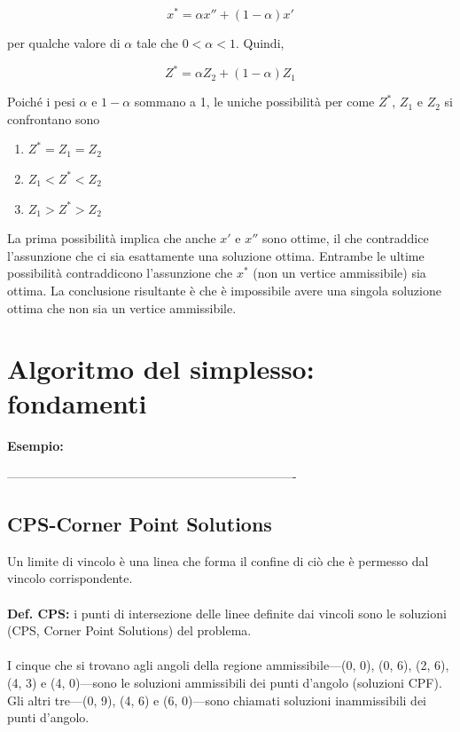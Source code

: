 \documentclass[a4paper, 11pt]{article}
\begin{document}
        $$
            x^* = \alpha x'' + (1 - \alpha) x'
        $$

        per qualche valore di $\alpha$ tale che $0 < \alpha < 1$. Quindi,

        $$
            Z^* = \alpha Z_2 + (1 - \alpha) Z_1
        $$

        Poiché i pesi $\alpha$ e $1 - \alpha$ sommano a 1, le uniche possibilità per come $Z^*$, $Z_1$ e $Z_2$ si confrontano sono

        \begin{enumerate}
            \item $Z^* = Z_1 = Z_2$
            \item $Z_1 < Z^* < Z_2$
            \item $Z_1 > Z^* > Z_2$
        \end{enumerate}

        La prima possibilità implica che anche $x'$ e $x''$ sono ottime, il che contraddice l'assunzione che ci sia esattamente una soluzione ottima. Entrambe le ultime possibilità contraddicono l'assunzione che $x^*$ (non un vertice ammissibile) sia ottima. La conclusione risultante è che è impossibile avere una singola soluzione ottima che non sia un vertice ammissibile.

       

    \section{Algoritmo del simplesso: fondamenti}
    \textbf{Esempio: }

    ----------------------------------------------------------------------
        
        \subsection{CPS-Corner Point Solutions}
        Un limite di vincolo è una linea che forma il confine di ciò che è permesso dal vincolo corrispondente.
        
        \paragraph{}
        \textbf{Def. CPS:} i punti di intersezione delle linee definite dai vincoli sono le soluzioni (CPS, Corner Point Solutions) del problema. 
        
        \paragraph{}
        I cinque che si trovano agli angoli della regione ammissibile—(0, 0), (0, 6), (2, 6), (4, 3) e (4, 0)—sono le soluzioni ammissibili dei punti d'angolo (soluzioni CPF). Gli altri tre—(0, 9), (4, 6) e (6, 0)—sono chiamati soluzioni inammissibili dei punti d'angolo.
        
\end{document}
